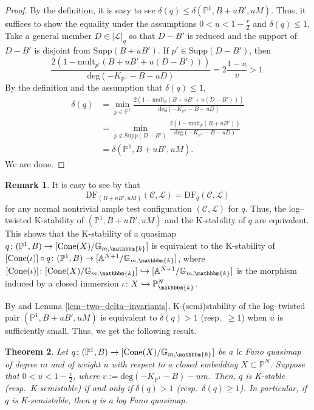 \documentclass[12pt,twoside]{amsart}
\newtheorem{thm}{Theorem}[section]
\theoremstyle{definition}
\newtheorem{rem}[thm]{Remark}
\begin{document}
\begin{proof}
    By the definition, it is easy to see $\delta(q)\le \delta(\mathbb{P}^1,B+uB',uM)$.
    Thus, it suffices to show the equality under the assumptions $0<u<1-\frac{v}{2}$ and $\delta(q)\le1$.
    Take a general member $D\in |\mathscr{L}|_{q}$ so that $D-B'$ is reduced and the support of $D-B'$ is disjoint from $\mathrm{Supp}(B+uB')$.
    If $p'\in \mathrm{Supp}(D-B')$, then 
    \[
    \frac{2(1-\mathrm{mult}_{p'}(B+uB'+u(D-B')))}{\mathrm{deg}(-K_{\mathbb{P}^1}-B-uD)}=2\frac{1-u}{v}>1.
    \]
    By the definition and the assumption that $\delta(q)\le 1$,  
    \begin{align*}
        \delta(q)&=\min_{p\in \mathbb{P}^1}\frac{2(1-\mathrm{mult}_{p}(B+uB'+u(D-B')))}{\mathrm{deg}(-K_{\mathbb{P}^1}-B-uD)}\\
        &=\min_{p\not\in \mathrm{Supp}(D-B')}\frac{2(1-\mathrm{mult}_{p}(B+uB'))}{\mathrm{deg}(-K_{\mathbb{P}^1}-B-uD)}\\
        &=\delta(\mathbb{P}^1,B+uB',uM).
    \end{align*}
    We are done.
\end{proof}


\begin{rem}\label{rem--K-stability--coincidence}
It is easy to see by \cite[Lemma 2.22]{Hat} that  
\[
\mathrm{DF}_{(B+uB',uM)}(\mathcal{C},\mathcal{L})=\mathrm{DF}_{q}(\mathcal{C},\mathcal{L})
\]
for any normal nontrivial ample test configuration $(\mathcal{C},\mathcal{L})$ for $q$.
Thus, the log--twisted K-stability of $(\mathbb{P}^1,B+uB',uM)$ and the K-stability of $q$ are equivalent.
   This shows that the K-stability of a quasimap $q\colon(\mathbb{P}^1,B)\to[\mathrm{Cone}(X)/\mathbb{G}_{m, \mathbbm{k}}]$ is equivalent to the K-stability of $[\mathrm{Cone}(\iota)]\circ q\colon(\mathbb{P}^1,B)\to[\mathbb{A}^{N+1}/\mathbb{G}_{m, \mathbbm{k}}]$, where $[\mathrm{Cone}(\iota)]\colon [\mathrm{Cone}(X)/\mathbb{G}_{m, \mathbbm{k}}]\hookrightarrow[\mathbb{A}^{N+1}/\mathbb{G}_{m, \mathbbm{k}}]$ is the morphism induced by a closed immersion $\iota\colon X\hookrightarrow \mathbb{P}^N_{\mathbbm{k}}$.
\end{rem}

By \cite[Theorem A.16]{Hat} and Lemma \ref{lem--two--delta--invariants}, K-(semi)stability of the log--twisted pair $(\mathbb{P}^1,B+uB',uM)$ is equivalent to $\delta(q)>1$ (resp.~$\ge1$) when $u$ is sufficiently small.
Thus, we get the following result.

\begin{thm}\label{thm--delta--quasimap}
    Let $q\colon(\mathbb{P}^1,B)\to [\mathrm{Cone}(X)/\mathbb{G}_{m, \mathbbm{k}}]$ be a lc Fano quasimap of degree $m$ and of weight $u$ with respect to a closed embedding $X\subset\mathbb{P}^N$.
    Suppose that $0<u<1-\frac{v}{2}$, where $v:=\mathrm{deg}(-K_{\mathbb{P}^1}-B)-um$.
    Then, $q$ is K-stable (resp.~K-semistable) if and only if $\delta(q)>1$ (resp.~$\delta(q)\ge1$).
    In particular, if $q$ is K-semistable, then $q$ is a log Fano quasimap.
\end{thm}
\end{document}
